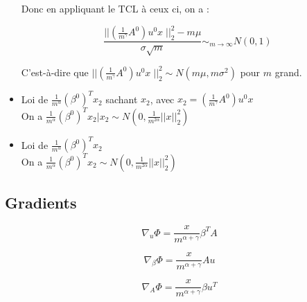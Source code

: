 \documentclass[a4paper, 11pt, french]{article}
\begin{document}
\begin{itemize}
		Donc en appliquant le TCL à ceux ci, on a :
		
		 \[
		 	\frac{|| \left(\frac{1}{m^{\gamma}} A^0 \right) u^0 x \; ||_2^2 - m \mu}{\sigma \sqrt{m}} \sim_{m \to \infty}  N(0, 1)
		 \]
		
		C'est-à-dire que $|| \left(\frac{1}{m^{\gamma}} A^0 \right) u^0 x \; ||_2^2 \sim 
		N(m \mu, m \sigma^2) $  pour $m$ grand. \\
		
		\newpage
		
		\item Loi de $ \frac{1}{m^{\alpha}} (\beta^0)^T x_2 $ sachant $x_2$, avec 
		$x_2 = \left(\frac{1}{m^{\gamma}} A^0 \right) u^0 x$ \\
		
		On a 
		$ \frac{1}{m^{\alpha}} (\beta^0)^T x_2 | x_2 \sim N(0,  \frac{1}{m^{2\alpha}}||x||_2^2) $
		\\
		
		\item Loi de $ \frac{1}{m^{\alpha}} (\beta^0)^T x_2 $ \\
		
		On a 
		$ \frac{1}{m^{\alpha}} (\beta^0)^T x_2 \sim N(0,  \frac{1}{m^{2\alpha}}||x||_2^2) $
		\\
		
	\end{itemize}
	
	\subsection*{Gradients}
	
	\[ \nabla_u \Phi = \frac{x}{m^{\alpha + \gamma}} \beta^T A \]
	
	\[ \nabla_{\beta} \Phi = \frac{x}{m^{\alpha + \gamma}} A u \]
	
	\[ \nabla_A \Phi = \frac{x}{m^{\alpha + \gamma}} \beta u^T \]
	
	
	
	
	
	
\end{document}
